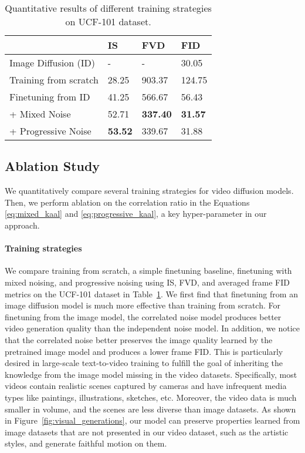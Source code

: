 \documentclass[10pt,twocolumn,letterpaper]{article}
\newcommand{\new}[1]{#1}
\newcommand{\tabcspace}{\vspace{-2mm}}
\newcommand{\tabspace}{\vspace{-4mm}}
\begin{document}
\begin{table}[t]
\centering
\caption{Quantitative results of different training strategies \new{on UCF-101 dataset.}}
\tabcspace
\label{tab:strategies}
\begin{tabular}{l|lll}
\toprule
                 & IS & FVD  &  FID  \\
\midrule
Image Diffusion (ID)  & -     & -      & 30.05  \\ \hline
Training from scratch  & 28.25 & 903.37 & 124.75 \\
Finetuning from ID      & 41.25 & 566.67 & 56.43  \\
\rowcolor[HTML]{DFDFDF} 
+ Mixed Noise        & 52.71 & \textbf{337.40} & \textbf{31.57}  \\
\rowcolor[HTML]{DFDFDF} 
+ Progressive Noise  & \textbf{53.52} & 339.67 & 31.88  \\
\bottomrule
\end{tabular}
\tabspace
\end{table} \subsection{Ablation Study}
We quantitatively compare several training strategies for video diffusion models. Then, we perform ablation on the correlation ratio in the Equations \ref{eq:mixed_kaal} and \ref{eq:progressive_kaal}, a key hyper-parameter in our approach.


\paragraph{Training strategies} We compare training from scratch, a simple finetuning baseline, finetuning with mixed noising, and progressive noising using IS, FVD, and averaged frame FID metrics \new{on the UCF-101 dataset} in Table~\ref{tab:strategies}. We first find that finetuning from an image diffusion model is much more effective than training from scratch. For finetuning from the image model, the correlated noise model produces better video generation quality than the independent noise model. In addition, we notice that the correlated noise better preserves the image quality learned by the pretrained image model and produces a lower frame FID. This is particularly desired in large-scale text-to-video training to fulfill the goal of inheriting the knowledge from the image model missing in the video datasets. \new{Specifically, most videos contain realistic scenes captured by cameras and have infrequent media types like paintings, illustrations, sketches, etc. 
Moreover, the video data is much smaller in volume, and the scenes are less diverse than image datasets.} As shown in Figure~\ref{fig:visual_generations}, our model can preserve properties learned from image datasets that are not presented in our video dataset, such as the artistic styles, and generate faithful motion on them.
\end{document}
